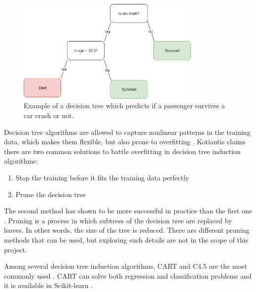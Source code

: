 \begin{figure}[H] 
	\centering
	\includegraphics[width=0.8\textwidth]{media/decisiontree_example.png}
	\caption{Example of a decision tree which predicts if a passenger survives a car crash or not.}
	\label{fig:decisiontree_example}
\end{figure}

		Decision tree algorithms are allowed to capture nonlinear patterns in the training data, which makes them flexible, but also prone to overfitting \cite{BOOK:7}. Kotiantis \cite{ARTICLE:7} claims there are two common solutions to battle overfitting in decision tree induction algorithms:
		\begin{enumerate}
			\item Stop the training before it fits the training data perfectly
			\item Prune the decision tree
		\end{enumerate}
		The second method has shown to be more successful in practice than the first one \cite{BOOK:8}. Pruning is a process in which subtrees of the decision tree are replaced by leaves. In other words, the size of the tree is reduced. There are different pruning methods that can be used, but exploring such details are not in the scope of this project.

		 Among several decision tree induction algorithms, CART and C4.5 are the most commonly used \cite{BOOK:8}. CART can solve both regression and classification problems and it is available in Scikit-learn \cite{WEBSITE:16}. %
		
